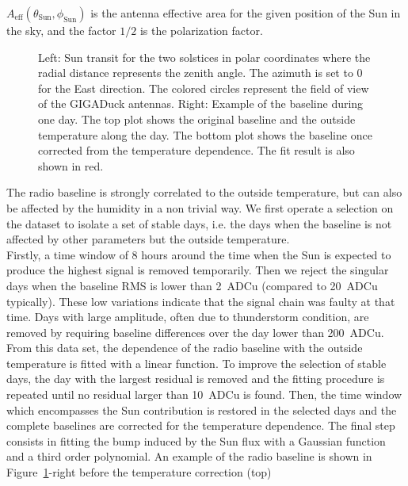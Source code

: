 $A_{\text{eff}}(\theta_{\text{Sun}},\phi_{\text{Sun}})    $   is   the
antenna effective area  for the given position of the  Sun in the sky,
and the factor $1/2$ is the polarization factor.
\begin{figure}[!ht]
 \centering
 \hspace*{-3ex}
 \caption{Left: Sun transit for the two solstices in polar coordinates
   where the radial distance  represents the zenith angle. The azimuth
   is set to  0 for the East direction.  The colored circles represent
   the field of view of  the GIGADuck antennas.  Right: Example of the
   baseline during one  day. The top plot shows  the original baseline
   and the outside  temperature along the day.  The  bottom plot shows
   the baseline  once corrected from the  temperature dependence.  The
   fit result is also shown in red.}
 \label{fig:sunsim}
\end{figure}
The radio baseline is  strongly correlated to the outside temperature,
but can  also be  affected by the  humidity in  a non trivial  way. We
first operate  a selection on the  dataset to isolate a  set of stable
days,  i.e.  the  days  when the  baseline  is not  affected by  other
parameters but the outside temperature.  \\Firstly, a time window of 8
hours around the time when the  Sun is expected to produce the highest
signal is removed temporarily.  Then  we reject the singular days when
the  baseline   RMS  is  lower   than  2~ADCu  (compared   to  20~ADCu
typically). These  low variations indicate  that the signal  chain was
faulty  at  that  time.   Days  with large  amplitude,  often  due  to
thunderstorm condition, are  removed by requiring baseline differences
over the day  lower than 200~ADCu. From this  data set, the dependence
of the  radio baseline with the  outside temperature is  fitted with a
linear function.   To improve  the selection of  stable days,  the day
with  the largest  residual is  removed and  the fitting  procedure is
repeated until  no residual larger  than 10~ADCu is found.   Then, the
time window which encompasses the  Sun contribution is restored in the
selected  days  and  the  complete  baselines are  corrected  for  the
temperature dependence.   The final step consists in  fitting the bump
induced by  the Sun flux  with a Gaussian  function and a  third order
polynomial.    An  example  of   the  radio   baseline  is   shown  in
Figure~\ref{fig:sunsim}-right before  the temperature correction (top)
